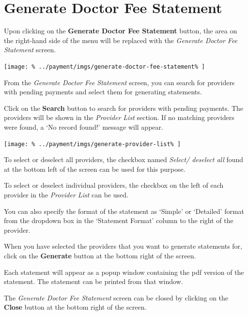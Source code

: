 \documentclass[../main/main]{subfiles}
\begin{document}
\newpage
\section{Generate Doctor Fee Statement}
\label{sec:generate-doctor-fee-statement}

Upon clicking on the \textbf{Generate Doctor Fee Statement} button,
the area on the right-hand side of the menu will be replaced with the
\emph{Generate Doctor Fee Statement} screen.

\texttt{[image: \%
  ../payment/imgs/generate-doctor-fee-statement\%
]}

From the \emph{Generate Doctor Fee Statement} screen, you can search for
providers with pending payments and select them for generating statements.

Click on the \textbf{Search} button to search for providers with pending
payments. The providers will be shown in the \emph{Provider List} section.
If no matching providers were found, a `No record found!' message will appear.

\texttt{[image: \%
  ../payment/imgs/generate-provider-list\%
]}

To select or deselect all providers, the checkbox named \emph{Select/ deselect
all} found at the bottom left of the screen can be used for this purpose.

To select or deselect individual providers, the checkbox on the left of each
provider in the \emph{Provider List} can be used.

You can also specify the format of the statement as `Simple' or `Detailed'
format from the dropdown box in the `Statement Format' column to the right
of the provider.

When you have selected the providers that you want to generate statements for,
click on the \textbf{Generate} button at the bottom right of the screen.

Each statement will appear as a popup window containing the pdf version of
the statement. The statement can be printed from that window.

The \emph{Generate Doctor Fee Statement} screen can be closed by clicking on the
\textbf{Close} button at the bottom right of the screen.
\end{document}
